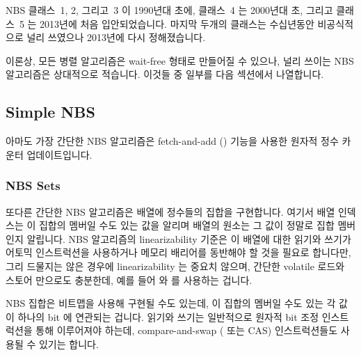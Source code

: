 NBS 클래스~1, 2, 그리고~3 이 1990년대 초에, 클래스~4 는 2000년대 초, 그리고
클래스~5 는 2013년에 처음 입안되었습니다.
마지막 두개의 클래스는 수십년동안 비공식적으로 널리 쓰였으나 2013년에 다시
정해졌습니다.

이론상, 모든 병렬 알고리즘은 wait-free 형태로 만들어질 수 있으나, 널리 쓰이는
NBS 알고리즘은 상대적으로 적습니다.
이것들 중 일부를 다음 섹션에서 나열합니다.

\iffalse

NBS classes~1, 2, and~3 were first formulated in the early 1990s,
class~4 was first formulated in the early 2000s,
and class~5 was first formulated in 2013.
The final two classes have seen informal use for a great many decades,
but were reformulated in 2013.

In theory, any parallel algorithm can be cast into wait-free form,
but there are a relatively small subset of NBS algorithms that are
in common use.
A few of these are listed in the following section.

\fi

\subsection{Simple NBS}
\label{sec:advsync:Simple NBS}

아마도 가장 간단한 NBS 알고리즘은 fetch-and-add ()
기능을 사용한 원자적 정수 카운터 업데이트입니다.

\iffalse

Perhaps the simplest NBS algorithm is atomic update of an integer
counter using fetch-and-add (\co{atomic_add_return()}) primitives.

\fi

\subsubsection{NBS Sets}
\label{sec:advsync:NBS Sets}

또다른 간단한 NBS 알고리즘은 배열에 정수들의 집합을 구현합니다.
여기서 배열 인덱스는 이 집합의 멤버일 수도 있는 값을 알리며 배열의 원소는 그
값이 정말로 집합 멤버인지 알립니다.
NBS 알고리즘의 linearizability 기준은 이 배열에 대한 읽기와 쓰기가 어토믹
인스트럭션을 사용하거나 메모리 배리어를 동반해야 할 것을 필요로 합니다만, 그리
드물지는 않은 경우에 linearizability 는 중요치 않으며, 간단한 volatile 로드와
스토어 만으로도 충분한데, 예를 들어  와  를
사용하는 겁니다.

NBS 집합은 비트맵을 사용해 구현될 수도 있는데, 이 집합의 멤버일 수도 있는 각
값이 하나의 bit 에 연관되는 겁니다.
읽기와 쓰기는 일반적으로 원자적 bit 조정 인스트럭션을 통해 이루어져야 하는데,
compare-and-swap ( 또는 CAS) 인스트럭션들도 사용될 수 있기는
합니다.

